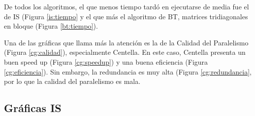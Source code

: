 De todos los algoritmos, el que menos tiempo tardó en ejecutarse de media fue el de IS (Figura \ref{is:tiempo} y el que más el algoritmo de BT, matrices tridiagonales en bloque (Figura \ref{bt:tiempo}).

\vspace{2mm}

Una de las gráficas que llama más la atención es la de la Calidad del Paralelismo (Figura \ref{cg:calidad}), especialmente Centella. En este caso, Centella presenta un buen speed up (Figura \ref{cg:speedup}) y una buena eficiencia (Figura \ref{cg:eficiencia}). Sin embargo, la redundancia es muy alta (Figura \ref{cg:redundancia}, por lo que la calidad del paralelismo es mala.

\newpage

\subsection{Gráficas IS}

